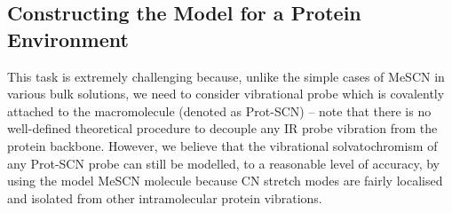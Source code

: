 \documentclass[b5paper,oneside,fleqn,11pt]{book}
\begin{document}
\begin{refsection}
\subsection{Constructing the Model for a Protein Environment\label{s:scn-protein-interfac-model-environ}}

This task is
extremely challenging because, unlike the simple cases of
MeSCN in various bulk solutions, we need to consider
vibrational probe which is covalently attached to the
macromolecule (denoted as Prot-SCN) -- note that there is no
well\hyp{}defined theoretical procedure to decouple any IR probe
vibration from the protein backbone. However, we believe
that the vibrational solvatochromism of any Prot-SCN probe
can still be modelled, to a reasonable level of accuracy, by
using the model MeSCN molecule because CN stretch modes
are fairly localised and isolated from other intramolecular
protein vibrations.


\end{refsection}
\end{document}
